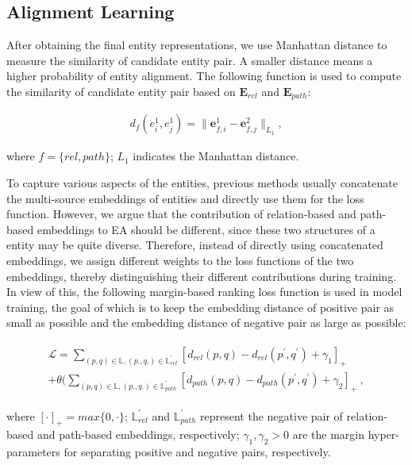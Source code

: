 \documentclass{article}
\begin{document}
\subsection{Alignment Learning}
After obtaining the final entity representations, we use Manhattan distance to measure the similarity of candidate entity pair. 
A smaller distance means a higher probability of entity alignment.
The following function is used to compute the similarity of candidate entity pair based on $\mathbf{E}_{rel}$ and $\mathbf{E}_{path}$:
\begin{small}
	\begin{align}
	d_f(e^1_i, e^1_j) = \| \mathbf{e}^1_{f,i} - \mathbf{e}^2_{f,j} \| _{L_1},
	\end{align}
\end{small}where 
$f \!=\! \{ rel, path \}$;
$L_1$ indicates the Manhattan distance.


To capture various aspects of the entities, previous methods usually concatenate the multi-source embeddings of entities and directly use them for the loss function.  %
However, we argue that the contribution of relation-based and path-based embeddings to EA should be different, since these two structures of a entity may be quite diverse.
Therefore, instead of directly using concatenated embeddings, we assign different weights to the loss functions of the two embeddings, thereby distinguishing their different contributions during training.
In view of this, the following margin-based ranking loss function is used in model training, the goal of which is to keep the embedding distance of positive pair as small as possible and the embedding distance of negative pair as large as possible:
\begin{small}
	\begin{align}
	\begin{split}
	\mathcal {L} \!=\!
	\sum_{(p, q) \in \mathbb{L}, (p_{\prime}, q_{\prime}) \in \mathbb{L}_{rel}^{\prime}}
	[ d_{rel}(p, q) - d_{rel}(p^{\prime}, q^{\prime}) +{\gamma}_{1} ]_{+}
	\\ + \theta (
	\sum_{(p, q) \in \mathbb{L},(p_{\prime}, q_{\prime}) \in \mathbb{L}_{path}^{\prime}}
	[ d_{path}(p, q) - d_{path}(p^{\prime}, q^{\prime}) +{\gamma}_{2} ]_{+} \ ,
	\end{split}
	\end{align}
\end{small}where 
$[\cdot ]_{+} \!=\! max \{ 0,\cdot \}$;
$\mathbb{L}_{rel}^{\prime}$ and $\mathbb{L}_{path}^{\prime}$ represent the negative pair of relation-based and path-based embeddings, respectively;
${\gamma}_{1},{\gamma}_{2} \!>\! 0$ are the margin hyper-parameters for separating positive and negative pairs, respectively.
\end{document}
